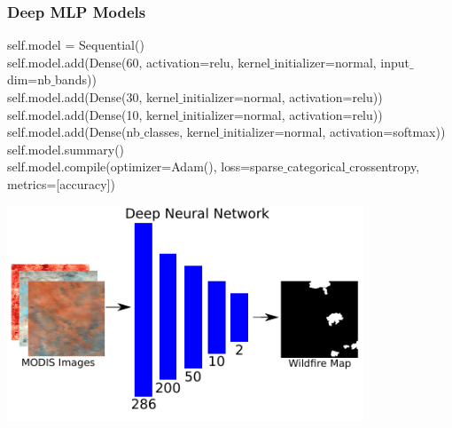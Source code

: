 \documentclass{beamer}
\begin{document}
\begin{frame}
  \frametitle{Deep MLP Models}
  
\scriptsize
self.model = Sequential() \\
self.model.add(Dense(60, activation=relu, kernel$\_$initializer=normal, 
input$\_$dim=nb$\_$bands)) \\
self.model.add(Dense(30, kernel$\_$initializer=normal, activation=relu)) \\
self.model.add(Dense(10, kernel$\_$initializer=normal, activation=relu)) \\
self.model.add(Dense(nb$\_$classes, kernel$\_$initializer=normal, activation=softmax)) \\
self.model.summary() \\
self.model.compile(optimizer=Adam(),
		loss=sparse$\_$categorical$\_$crossentropy,
		metrics=[accuracy])

\includegraphics[width=0.8\textwidth]{figs/dnn_fig}



\end{frame} 
\end{document}
